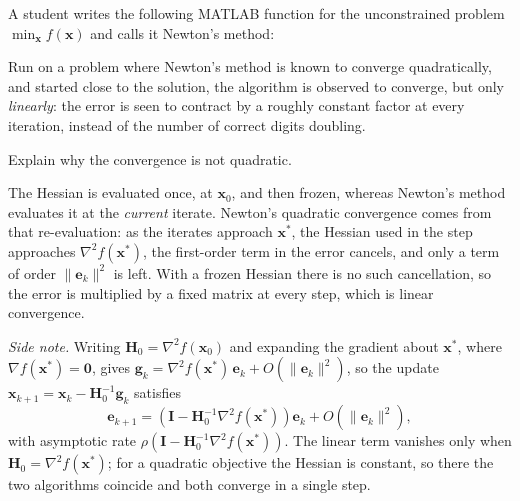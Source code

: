 \begin{exercise} %
    
    A student writes the following MATLAB function for the unconstrained problem $\min_{\mathbf{x}} f(\mathbf{x})$ and calls it Newton's method:
    
    Run on a problem where Newton's method is known to converge quadratically, and started close to the solution, the algorithm is observed to converge, but only \emph{linearly}: the error is seen to contract by a roughly constant factor at every iteration, instead of the number of correct digits doubling.

    Explain why the convergence is not quadratic.
    
\end{exercise}

\begin{solution}
    
    The Hessian is evaluated once, at $\mathbf{x}_0$, and then frozen, whereas Newton's method evaluates it at the \emph{current} iterate. Newton's quadratic convergence comes from that re-evaluation: as the iterates approach $\mathbf{x}^*$, the Hessian used in the step approaches $\nabla^2 f(\mathbf{x}^*)$, the first-order term in the error cancels, and only a term of order $\|\mathbf{e}_k\|^2$ is left. With a frozen Hessian there is no such cancellation, so the error is multiplied by a fixed matrix at every step, which is linear convergence.

    \emph{Side note.} Writing $\mathbf{H}_0 = \nabla^2 f(\mathbf{x}_0)$ and expanding the gradient about $\mathbf{x}^*$, where $\nabla f(\mathbf{x}^*) = \mathbf{0}$, gives $\mathbf{g}_k = \nabla^2 f(\mathbf{x}^*)\, \mathbf{e}_k + O(\|\mathbf{e}_k\|^2)$, so the update $\mathbf{x}_{k+1} = \mathbf{x}_k - \mathbf{H}_0^{-1}\mathbf{g}_k$ satisfies
    \[
        \mathbf{e}_{k+1} = \left( \mathbf{I} - \mathbf{H}_0^{-1} \nabla^2 f(\mathbf{x}^*) \right) \mathbf{e}_k + O(\|\mathbf{e}_k\|^2),
    \]
    with asymptotic rate $\rho\left( \mathbf{I} - \mathbf{H}_0^{-1} \nabla^2 f(\mathbf{x}^*) \right)$. The linear term vanishes only when $\mathbf{H}_0 = \nabla^2 f(\mathbf{x}^*)$; for a quadratic objective the Hessian is constant, so there the two algorithms coincide and both converge in a single step.
    
\end{solution}

